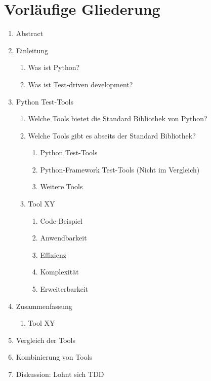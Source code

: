 \section{Vorläufige Gliederung}
\begin{enumerate}[label*=\arabic*.]
    \item Abstract
    \item Einleitung
    \begin{enumerate}[label*=\arabic*.]
        \item Was ist Python?
        \item Was ist Test-driven development?
    \end{enumerate}
    \item Python Test-Tools
    \begin{enumerate}[label*=\arabic*.]
        \item Welche Tools bietet die Standard Bibliothek von Python?
        \item Welche Tools gibt es abseits der Standard Bibliothek?
        \begin{enumerate}[label*=\arabic*.]
            \item Python Test-Tools
            \item Python-Framework Test-Tools (Nicht im Vergleich)
            \item Weitere Tools
        \end{enumerate}
        \item Tool XY
        \begin{enumerate}[label*=\arabic*.]
            \item Code-Beispiel
            \item Anwendbarkeit
            \item Effizienz
            \item Komplexität
            \item Erweiterbarkeit
        \end{enumerate}
    \end{enumerate}
    \item Zusammenfassung
    \begin{enumerate}[label*=\arabic*.]
        \item Tool XY
    \end{enumerate}
    \item Vergleich der Tools
    \item Kombinierung von Tools
    \item Diskussion: Lohnt sich TDD
    \begin{enumerate}[label*=\arabic*.]

\end{enumerate}
\end{enumerate}
